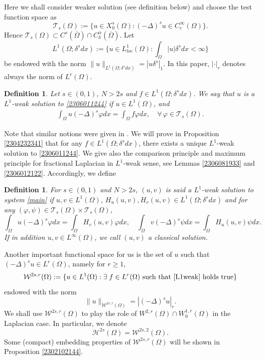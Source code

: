 \documentclass[10pt]{article}
\numberwithin{equation}{section}
\newtheorem{definition}[theorem]{Definition}
\numberwithin{equation}{section}
\begin{document}
Here we shall consider weaker solution (see definition below) and choose the test function space as
\[
\mathcal{T}_s(\Omega):=\{u\in X_0^s(\Omega): (-\Delta)^s u\in  C_c^{\infty}(\Omega)\}.
\]
Hence $\mathcal{T}_s(\Omega) \subset C^s(\overline{\Omega})\cap C_{\delta}^{\alpha}(\overline{\Omega})$. Let
\[
L^1(\Omega; \delta^s dx) :=\Big\{u\in L^1_{loc}(\Omega): \int_{\Omega} |u|\delta^sdx<\infty\Big\}
\]
be endowed with the norm $\|u\|_{L^1(\Omega; \delta^s dx)}= |u \delta^s|_1$. In this paper, $|\cdot|_r$ denotes always the norm of $L^r(\Omega)$.
\begin{definition}\label{2211161306}
Let $s\in (0, 1)$, $N>2s$ and $f\in L^1(\Omega; \delta^s dx)$. We say that $u$ is a $L^1$-weak solution to \eqref{2306011244} if $u\in L^1(\Omega)$, and
\begin{align}
\label{L1weak}
\int_{\Omega}u(-\Delta)^s\varphi dx=\int_{\Omega}f \varphi dx,\quad  \forall \, \varphi\in \mathcal{T}_s(\Omega).
\end{align}
\end{definition}
\noindent
Note that similar notions were given in \cite{RS2014-1, LPPS2015}. We will prove in Proposition \ref{2304232341} that for any $f\in L^1(\Omega; \delta^s dx)$, there exists a unique $L^1$-weak solution to \eqref{2306011244}. We give also the comparison principle and maximum principle for fractional Laplacian in $L^1$-weak sense, see Lemmas \ref{2306081933} and \ref{2306012122}. Accordingly, we define
\begin{definition}
For $s\in (0, 1)$ and $N>2s$, $(u, v)$ is said a $L^1$-weak solution to system \eqref{main} if $u, v \in L^1(\Omega)$, $H_u(u, v), H_v(u, v)\in L^1(\Omega; \delta^sdx)$ and for any $(\varphi, \psi)\in \mathcal{T}_s(\Omega)\times \mathcal{T}_s(\Omega)$,
\[
\int_{\Omega} u(-\Delta)^s\varphi dx=\int_{\Omega} H_v(u, v)\varphi dx,\quad
\int_{\Omega} v(-\Delta)^s\psi dx=\int_{\Omega} H_u(u, v)\psi dx.
\]
If in addition $u, v\in L^{\infty}(\Omega)$, we call $(u, v)$ a {\sl classical solution}.
\end{definition}

Another important functional space for us is the set of $u$ such that $(-\Delta)^s u\in L^r(\Omega)$, namely for $r \geq 1$,
\begin{equation}\label{2401141656}
\mathcal{W}^{2s, r}(\Omega):=\{u\in L^1(\Omega): \exists\; f \in L^r(\Omega) \mbox{ such that \eqref{L1weak} holds true}\}
\end{equation}
endowed with the norm
$$\|u\|_{\mathcal{W}^{2s, r}(\Omega)}=|(-\Delta)^s u|_r.$$
We shall use $\mathcal{W}^{2s, r}(\Omega)$ to play the role of $W^{2, r}(\Omega)\cap W_0^{1, r}(\Omega)$ in the Laplacian case. In particular, we denote
\[
\mathcal{H}^{2s}(\Omega)=\mathcal{W}^{2s, 2}(\Omega).
\]
Some (compact) embedding properties of $\mathcal{W}^{2s, r}(\Omega)$ will be shown in Proposition \ref{2302102144}. 
\end{document}

